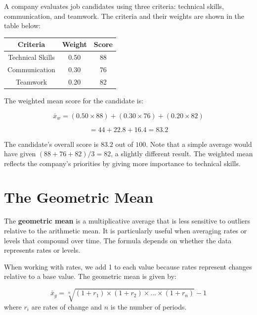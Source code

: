 \documentclass[
  11pt,
  letterpaper,
  DIV=11,
  numbers=noendperiod,
  oneside,
  open=any]{scrreprt}
\begin{document}
\begin{bsexample}[Example 2]

A company evaluates job candidates using three criteria: technical
skills, communication, and teamwork. The criteria and their weights are
shown in the table below:

\begin{center}
\begin{tabular}{ccc}
\toprule
Criteria & Weight & Score \\
\midrule
Technical Skills & 0.50 & 88 \\
Communication & 0.30 & 76 \\
Teamwork & 0.20 & 82 \\
\bottomrule
\end{tabular}
\end{center}

The weighted mean score for the candidate is:

\[\bar{x}_w = (0.50 \times 88) + (0.30 \times 76) + (0.20 \times 82)\]

\[= 44 + 22.8 + 16.4 = 83.2\]

The candidate's overall score is \(83.2\) out of \(100\). Note that a
simple average would have given \((88 + 76 + 82)/3 = 82\), a slightly
different result. The weighted mean reflects the company's priorities by
giving more importance to technical skills.

\end{bsexample}

\section{The Geometric Mean}\label{the-geometric-mean}

The \textbf{geometric mean} is a multiplicative average that is less
sensitive to outliers relative to the arithmetic mean. It is
particularly useful when averaging rates or levels that compound over
time. The formula depends on whether the data represents rates or
levels.

When working with rates, we add 1 to each value because rates represent
changes relative to a base value. The geometric mean is given by:

\begin{bsformula}

\[\bar{x}_g=\sqrt[n]{(1+r_1)\times(1+r_2)\times...\times(1+r_n)}-1\]
where \(r_i\) are rates of change and \(n\) is the number of periods.

\end{bsformula}
\end{document}
